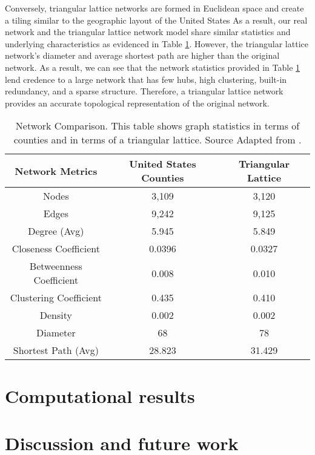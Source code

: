 Conversely, triangular lattice networks are formed in Euclidean space and create a tiling similar to the geographic layout of the United States  As a result, our real network and the triangular lattice network model share similar statistics and underlying characteristics as evidenced in Table \ref{networksummary}.  However, the triangular lattice network’s diameter and average shortest path are higher than the original network.  As a result, we can see that the network statistics provided in Table \ref{networksummary} lend credence to a large network that has few hubs, high clustering, built-in redundancy, and a sparse structure.  Therefore, a triangular lattice network provides an accurate topological representation of the original network.

\vspace{-0.5 in}

\begin{center}
    \begin{table}[h]
    \caption[Network Comparison]{Network Comparison.  This table shows graph statistics in terms of counties and in terms of a triangular lattice. Source Adapted from \cite{USCBAdjacency}.}\label{networksummary}
    \begin{center}
     \begin{tabular}{||c | c | c||} 
     \hline 
     \textbf{Network Metrics} & \textbf{United States Counties} & \textbf{Triangular Lattice} \\ [0.5ex] 
     \hline\hline
     Nodes & 3,109 & 3,120  \\ 
     \hline
     Edges & 9,242 & 9,125  \\
     \hline
     Degree (Avg) & 5.945 & 5.849  \\
     \hline
     Closeness Coefficient & 0.0396 & 0.0327 \\
     \hline
     Betweenness Coefficient & 0.008 & 0.010 \\
     \hline
     Clustering Coefficient & 0.435 & 0.410 \\
     \hline
     Density & 0.002 & 0.002 \\
     \hline
     Diameter & 68 & 78 \\
     \hline
     Shortest Path (Avg) & 28.823 & 31.429 \\ [1ex] 
     \hline
    \end{tabular}
    \end{center}

    \end{table}
\end{center}

\section{Computational results}


\section{Discussion and future work}